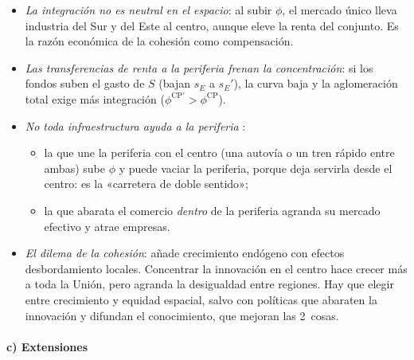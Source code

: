 \documentclass[11pt]{article}
\begin{document}
\begin{itemize}
\item \emph{La integración no es neutral en el espacio}: al subir $\phi$, el mercado único lleva industria del Sur y del Este al centro, aunque eleve la renta del conjunto. Es la razón económica de la cohesión como compensación.
\item \emph{Las transferencias de renta a la periferia frenan la concentración}: si los fondos suben el gasto de $S$ (bajan $s_E$ a $s_E'$), la curva baja y la aglomeración total exige más integración ($\phi^{\mathrm{CP}\prime}>\phi^{\mathrm{CP}}$).
\item \emph{No toda infraestructura ayuda a la periferia} \nocite{MartinRogers1995,Martin1999}:
  \begin{itemize}
  \item la que une la periferia con el centro (una autovía o un tren rápido entre ambas) sube $\phi$ y puede vaciar la periferia, porque deja servirla desde el centro: es la «carretera de doble sentido»;
  \item la que abarata el comercio \emph{dentro} de la periferia agranda su mercado efectivo y atrae empresas.
  \end{itemize}
\item \emph{El dilema de la cohesión}: \textcite{Martin1999} añade crecimiento endógeno con efectos desbordamiento locales. Concentrar la innovación en el centro hace crecer más a toda la Unión, pero agranda la desigualdad entre regiones. Hay que elegir entre crecimiento y equidad espacial, salvo con políticas que abaraten la innovación y difundan el conocimiento, que mejoran las 2~cosas.
\end{itemize}

\paragraph{c) Extensiones}
\end{document}
